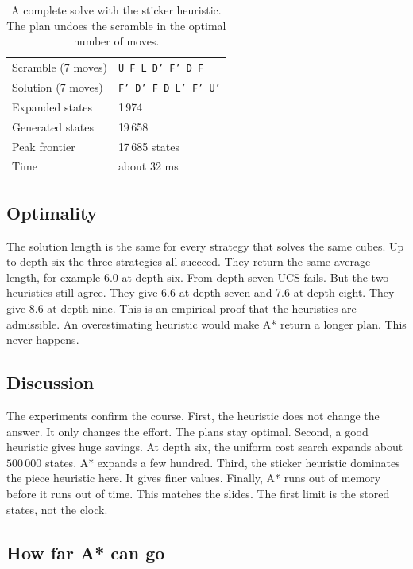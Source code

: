 \documentclass[11pt,a4paper]{article}
\begin{document}
\begin{table}[H]
\centering
\small
\begin{tabular}{ll}
\toprule
Scramble (7 moves) & \texttt{U F L D' F' D F} \\
Solution (7 moves) & \texttt{F' D' F D L' F' U'} \\
Expanded states    & 1\,974 \\
Generated states   & 19\,658 \\
Peak frontier      & 17\,685 states \\
Time               & about 32 ms \\
\bottomrule
\end{tabular}
\caption{A complete solve with the sticker heuristic. The plan undoes the
scramble in the optimal number of moves.}
\label{tab:example}
\end{table}

\subsection{Optimality}

The solution length is the same for every strategy that solves the same cubes.
Up to depth six the three strategies all succeed. They return the same average
length, for example 6.0 at depth six. From depth seven UCS fails. But the two
heuristics still agree. They give 6.6 at depth seven and 7.6 at depth eight. They
give 8.6 at depth nine. This is an empirical proof that the heuristics are
admissible. An overestimating
heuristic would make A* return a longer plan. This never happens.

\subsection{Discussion}

The experiments confirm the course. First, the heuristic does not change the
answer. It only changes the effort. The plans stay optimal. Second, a good
heuristic gives huge savings. At depth six, the uniform cost search expands about
$500\,000$ states. A* expands a few hundred. Third, the sticker heuristic dominates
the piece heuristic here. It gives finer values. Finally, A* runs out of memory
before it runs out of time. This matches the slides. The first limit is the stored
states, not the clock.

\subsection{How far A* can go}
\end{document}
